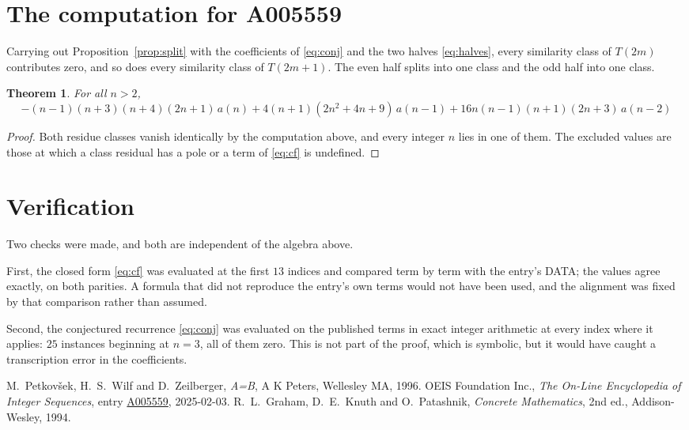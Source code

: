 \documentclass[11pt,a4paper]{article}
\theoremstyle{plain}
\newtheorem{theorem}{Theorem}
\theoremstyle{definition}
\begin{document}
\section{The computation for A005559}

Carrying out Proposition~\ref{prop:split} with the coefficients of \eqref{eq:conj} and the
two halves \eqref{eq:halves}, every similarity class of $T(2m)$ contributes zero, and so
does every similarity class of $T(2m+1)$. The even half splits into one class
and the odd half into one class.

\begin{theorem}
For all $n> 2$,
\[
- \left(n - 1\right) \left(n + 3\right) \left(n + 4\right) \left(2 n + 1\right)\,a(n) + 4 \left(n + 1\right) \left(2 n^{2} + 4 n + 9\right)\,a(n-1) + 16 n \left(n - 1\right) \left(n + 1\right) \left(2 n + 3\right)\,a(n-2)
\]
\end{theorem}

\begin{proof}
Both residue classes vanish identically by the computation above, and every integer $n$
lies in one of them. The excluded values are those at which a class residual has a pole or
a term of \eqref{eq:cf} is undefined.
\end{proof}

\section{Verification}

Two checks were made, and both are independent of the algebra above.

First, the closed form \eqref{eq:cf} was evaluated at the first $13$ indices and
compared term by term with the entry's DATA; the values agree exactly, on both parities. A
formula that did not reproduce the entry's own terms would not have been used, and the
alignment was fixed by that comparison rather than assumed.

Second, the conjectured recurrence \eqref{eq:conj} was evaluated on the published terms in
exact integer arithmetic at every index where it applies: $25$ instances beginning at
$n=3$, all of them zero. This is not part of the proof, which is symbolic, but it
would have caught a transcription error in the coefficients.

\begin{thebibliography}{9}
 M.~Petkov\v{s}ek, H.~S.~Wilf and D.~Zeilberger, \emph{A=B}, A K Peters,
Wellesley MA, 1996.
 OEIS Foundation Inc., \emph{The On-Line Encyclopedia of Integer Sequences},
entry \href{https://oeis.org/A005559}{A005559}, 2025-02-03.
 R.~L.~Graham, D.~E.~Knuth and O.~Patashnik, \emph{Concrete Mathematics},
2nd ed., Addison-Wesley, 1994.
\end{thebibliography}
\end{document}
